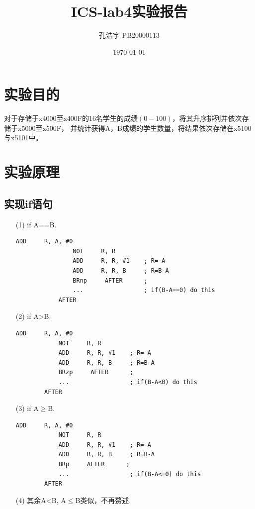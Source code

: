\documentclass[UTF8]{ctexart}
\title{ICS-lab4实验报告}
\author{孔浩宇 PB20000113}
\date{\today}
\begin{document}
\fancyfoot[C]{\thepage}

\maketitle
\tableofcontents
\newpage

\section{实验目的}
    对于存储于x4000至x400F的16名学生的成绩$(0-100)$，将其升序排列并依次存储于x5000至x500F，
    并统计获得A，B成绩的学生数量，将结果依次存储在x5100与x5101中。

\section{实验原理}
    \subsection{实现if语句}
    \begin{enumerate}
        \item [(1)]if A==B.
        \begin{lstlisting}[basicstyle=\ttfamily,language={[x86masm]Assembler}]
                ADD     R, A, #0
                NOT     R, R
                ADD     R, R, #1    ; R=-A
                ADD     R, R, B     ; R=B-A
                BRnp     AFTER      ;
                ...                 ; if(B-A==0) do this
            AFTER                   
        \end{lstlisting}

        \item [(2)]if A>B.
        \begin{lstlisting}[basicstyle=\ttfamily,language={[x86masm]Assembler}]
            ADD     R, A, #0
            NOT     R, R
            ADD     R, R, #1    ; R=-A
            ADD     R, R, B     ; R=B-A
            BRzp     AFTER      ;
            ...                 ; if(B-A<0) do this
        AFTER                   
        \end{lstlisting}

        \item [(3)]if A$\geq$B.
        \begin{lstlisting}[basicstyle=\ttfamily,language={[x86masm]Assembler}]
            ADD     R, A, #0
            NOT     R, R
            ADD     R, R, #1    ; R=-A
            ADD     R, R, B     ; R=B-A
            BRp     AFTER      ;
            ...                 ; if(B-A<=0) do this
        AFTER                   
        \end{lstlisting}

        \item [(4)]其余A<B, A$\leq$B类似，不再赘述.
    \end{enumerate}
\end{document}
